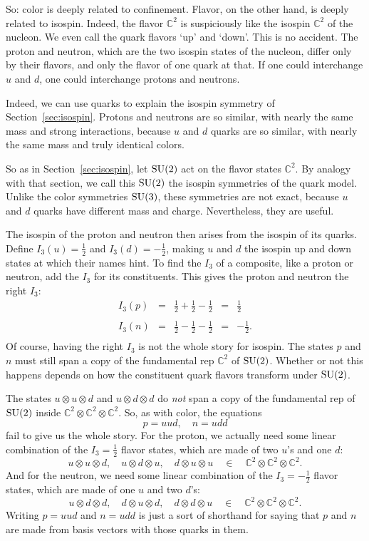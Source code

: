\documentclass[12pt]{article}
\newcommand{\C}{{\mathbb C}}  %
\newcommand{\SU}{{\rm SU}}    %
\newcommand{\half}{\frac{1}{2}} %
\begin{document}
So: color is deeply related to confinement.  Flavor, on the other hand,
is deeply related to isospin.  Indeed, the flavor $\C^2$ is
suspiciously like the isospin $\C^2$ of the nucleon.  We even call the
quark flavors `up' and `down'.  This is no accident.  The proton and
neutron, which are the two isospin states of the nucleon, differ only
by their flavors, and only the flavor of one quark at that. If one
could interchange $u$ and $d$, one could interchange protons and
neutrons.

Indeed, we can use quarks to explain the isospin symmetry of
Section~\ref{sec:isospin}. Protons and neutrons are so similar, with
nearly the same mass and strong interactions, because $u$ and $d$
quarks are so similar, with nearly the same mass and truly identical
colors.

So as in Section~\ref{sec:isospin}, let $\SU(2)$ act on the flavor
states $\C^2$. By analogy with that section, we call this $\SU(2)$ the
isospin symmetries of the quark model. Unlike the color symmetries
$\SU(3)$, these symmetries are not exact, because $u$ and $d$ quarks
have different mass and charge.  Nevertheless, they are useful.

The isospin of the proton and neutron then arises from the isospin of
its quarks. Define $I_3(u) = \half$ and $I_3(d) = -\half$, making $u$
and $d$ the isospin up and down states at which their names hint. To
find the $I_3$ of a composite, like a proton or neutron, add the $I_3$
for its constituents.  This gives the proton and neutron the right
$I_3$:
\[
\begin{array}{ccccr}
	I_3( p ) & = & \half + \half - \half &=& \half \\
                                                       \\
	I_3( n ) & = & \half - \half - \half &=& -\half. \\
\end{array}
\]
Of course, having the right $I_3$ is not the whole story for
isospin. The states $p$ and $n$ must still span a copy of the fundamental rep
$\C^2$ of $\SU(2)$. Whether or not this happens depends on how the
constituent quark flavors transform under $\SU(2)$.

The states $u \otimes u \otimes d$ and $u \otimes d \otimes d$ 
do \emph{not} span a copy of the fundamental rep of $\SU(2)$ inside
$\C^2 \otimes \C^2 \otimes \C^2$.  So, as with color, the equations
\[ p = uud, \quad n = udd \]
fail to give us the whole story. For the proton, we actually need some linear
combination of the $I_3 = \half$ flavor states, which are made of two $u$'s and
one $d$:
\[ u \otimes u \otimes d, \quad u \otimes d \otimes u, \quad d \otimes u \otimes u  \quad \in \quad \C^2 \otimes \C^2 \otimes \C^2. \]
And for the neutron, we need some linear combination of the $I_3 = -\half$ 
flavor states, which are made of one $u$ and two $d$'s:
\[ u \otimes d \otimes d, \quad d \otimes u \otimes d, \quad d \otimes d \otimes u  \quad \in \quad \C^2 \otimes \C^2 \otimes \C^2.   \]
Writing $p = uud$ and $n = udd$ is just a sort of 
shorthand for saying that $p$ and $n$ are made from basis vectors 
with those quarks in them.
\end{document}

